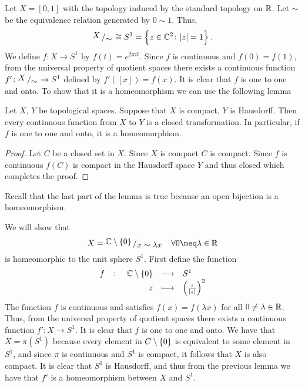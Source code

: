 \documentclass[11pt,a4paper]{article}
\begin{document}
\begin{example}
  Let $X = [0,1]$ with the topology induced by the standard topology on $\mathbb{R}$.
  Let $\sim$ be the equivalence relation generated by $0 \sim 1$.
  Thus,
  \[
    \bigslant{X}{\sim} \cong S^1 = \set{z \in \C^2 \colon |z| = 1}.
  \]
  We define $f \colon X \to S^1$ by $f(t) = e^{2 \pi i t}$.
  Since $f$ is continuous and $f(0) = f(1)$, from the universal property
  of quotient spaces there exists a continuous function 
  $f' \colon \bigslant{X}{\sim} \to S^1$ defined by $f'([x]) = f(x)$.
  It is clear that $f$ is one to one and onto.
  To show that it is a homeomorphism we can use the following lemma
  \begin{lemma}
    Let $X$, $Y$ be topological spaces.
    Suppose that $X$ is compact, $Y$ is Hausdorff.
    Then every continuous function from $X$ to $Y$ is a closed transformation.
    In particular, if $f$ is one to one and onto, it is a homeomorphism.
  \end{lemma}
  \begin{proof}
    Let $C$ be a closed set in $X$.
    Since $X$ is compact $C$ is compact.
    Since $f$ is continuous $f(C)$ is compact in the Hausdorff space $Y$
    and thus closed which completes the proof.
  \end{proof}
  \begin{remark}
    Recall that the last part of the lemma is true because an open bijection
    is a homeomorphism.
  \end{remark}
\end{example}

\begin{example}
  We will show that
  \[
    X = \bigslant{\C \setminus \set{0}}{x \sim \lambda x} \quad
    \forall 0 \meq \lambda \in \R
  \]
  is homeomorphic to the unit sphere $S^1$.
  First define the function
  \[
    \fullfunction{f}{\C \setminus \set{0}}{S^1}{z}{\del{\frac{z}{|z|}}^2}
  \]
  The function $f$ is continuous and satisfies $f(x) = f(\lambda x)$ for all
  $0 \neq \lambda \in \mathbb{R}$.
  Thus, from the universal property of quotient spaces there exists
  a continuous function $f' \colon X \to S^1$.
  It is clear that $f$ is one to one and onto.
  We have that $X = \pi(S^1)$ because every element in $C \setminus \set{0}$
  is equivalent to some element in $S^1$, and since $\pi$ is continuous
  and $S^1$ is compact, it follows that $X$ is also compact.
  It is clear that $S^1$ is Hausdorff, and thus from the previous lemma
  we have that $f'$ is a homeomorphism between $X$ and $S^1$.
\end{example}
\end{document}
